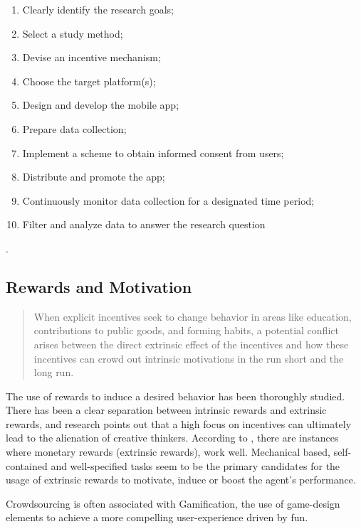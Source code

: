 \documentclass[letterpaper]{article}
\begin{document}
\begin{enumerate}
		
\item Clearly identify the research goals; \item Select a study method; \item Devise an incentive mechanism;  \item Choose the target platform(s); \item Design and develop the mobile app; \item Prepare data collection; \item Implement a scheme to obtain informed consent from users; \item Distribute and promote the app; \item Continuously monitor data collection for a designated time period; \item Filter and analyze data to answer the research question
\end{enumerate} 
\cite{Henze2013}.


\subsection{Rewards and Motivation}



\begin{quote}
When explicit incentives seek to change behavior in areas like education, contributions to public goods, and forming habits, a potential conflict arises between
the direct extrinsic effect of the incentives and how these incentives can crowd
out intrinsic motivations in the run short and the long run.
\end{quote}
\cite{Gneezy2011}




The use of rewards to induce a desired behavior has been thoroughly studied. 
There has been a clear separation between intrinsic rewards and extrinsic rewards, and research points out that a high focus on incentives can ultimately lead to the alienation of creative thinkers. 
According to \cite{Gneezy2011}, there are instances where monetary rewards (extrinsic rewards), work well. Mechanical based, self-contained and well-specified tasks seem to be the primary candidates for the usage of extrinsic rewards to motivate, induce or boost the agent's performance\cite{Ariely2009}.

Crowdsourcing is often associated with Gamification, the use of game-design elements to achieve a more compelling user-experience driven by fun.
\end{document}

